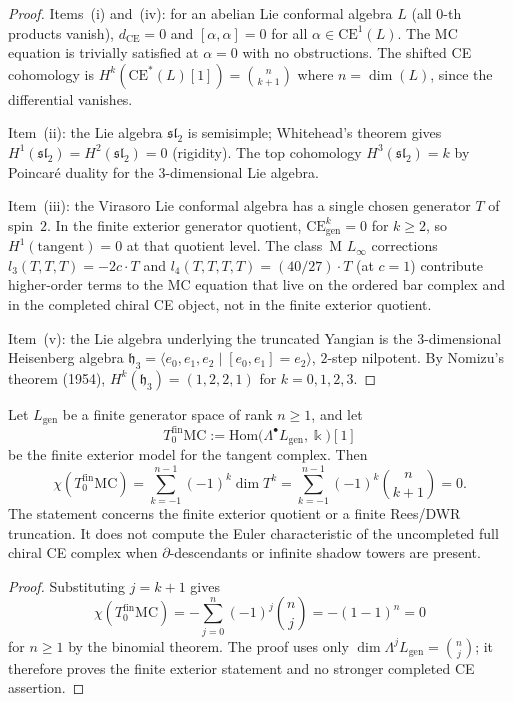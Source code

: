 \begin{proof}
Items~(i) and~(iv): for an abelian Lie conformal algebra $L$ (all $0$-th products vanish), $d_{\mathrm{CE}} = 0$ and $[\alpha, \alpha] = 0$ for all $\alpha \in \mathrm{CE}^1(L)$. The MC equation is trivially satisfied at $\alpha = 0$ with no obstructions. The shifted CE cohomology is $H^k(\mathrm{CE}^*(L)[1]) = \binom{n}{k+1}$ where $n = \dim(L)$, since the differential vanishes.

Item~(ii): the Lie algebra $\mathfrak{sl}_2$ is semisimple; Whitehead's theorem gives $H^1(\mathfrak{sl}_2) = H^2(\mathfrak{sl}_2) = 0$ (rigidity). The top cohomology $H^3(\mathfrak{sl}_2) = k$ by Poincar\'e duality for the $3$-dimensional Lie algebra.

Item~(iii): the Virasoro Lie conformal algebra has a single chosen
generator $T$ of spin~$2$. In the finite exterior generator quotient,
$\mathrm{CE}^k_{\mathrm{gen}} = 0$ for $k \geq 2$, so
$H^1(\text{tangent}) = 0$ at that quotient level. The class~M
$L_\infty$ corrections $l_3(T,T,T) = -2c \cdot T$ and
$l_4(T,T,T,T) = (40/27) \cdot T$ \textup{(}at $c = 1$\textup{)}
contribute higher-order terms to the MC equation that live on the
ordered bar complex and in the completed chiral CE object, not in the
finite exterior quotient.

Item~(v): the Lie algebra underlying the truncated Yangian is the $3$-dimensional Heisenberg algebra $\mathfrak{h}_3 = \langle e_0, e_1, e_2 \mid [e_0, e_1] = e_2 \rangle$, $2$-step nilpotent. By Nomizu's theorem (1954), $H^k(\mathfrak{h}_3) = (1, 2, 2, 1)$ for $k = 0, 1, 2, 3$.
\end{proof}

\begin{proposition}
\label{prop:mc-tangent-euler-char}
\ClaimStatusProvedHere
Let \(L_{\mathrm{gen}}\) be a finite generator space of rank
\(n\geq1\), and let
\[
  T^{\mathrm{fin}}_0\mathrm{MC}
  :=\mathrm{Hom}\bigl(\Lambda^\bullet L_{\mathrm{gen}},\Bbbk\bigr)[1]
\]
be the finite exterior model for the tangent complex. Then
\[
 \chi(T^{\mathrm{fin}}_0\mathrm{MC})
 = \sum_{k=-1}^{n-1} (-1)^k \dim T^k
 = \sum_{k=-1}^{n-1} (-1)^k \binom{n}{k+1} = 0.
\]
The statement concerns the finite exterior quotient or a finite
Rees/DWR truncation. It does not compute the Euler characteristic of
the uncompleted full chiral CE complex when \(\partial\)-descendants or
infinite shadow towers are present.
\end{proposition}

\begin{proof}
Substituting $j = k + 1$ gives
\[
  \chi(T^{\mathrm{fin}}_0\mathrm{MC})
  = -\sum_{j=0}^{n} (-1)^j \binom{n}{j}
  = -(1 - 1)^n
  = 0
\]
for $n \geq 1$ by the binomial theorem. The proof uses only
\(\dim \Lambda^j L_{\mathrm{gen}}=\binom n j\); it therefore proves the
finite exterior statement and no stronger completed CE assertion.
\end{proof}

